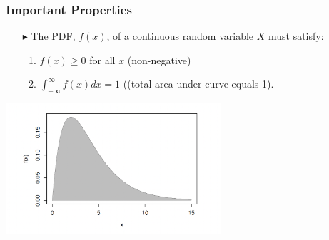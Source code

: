 \documentclass[12pt]{beamer}
\begin{document}
\begin{frame}
	\frametitle{Important Properties}
	\begin{itemize}
		\item[\color{blue}$\blacktriangleright$] The PDF, $f(x)$, of a continuous random variable $X$ must satisfy:
		\begin{enumerate}[label=\textcolor{blue}{\arabic*.}]
			\item $f(x)\ge0$ for all $x$ (non-negative)
			\item $\int_{-\infty}^{\infty}f(x)dx=1$ ((total area under curve equals 1).
		\end{enumerate}
	\end{itemize}
	\centering
	\includegraphics[width=8cm]{pdf2.png}
\end{frame}
\end{document}
